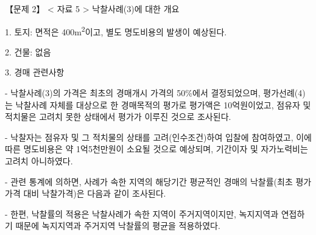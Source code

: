 \begin{longquestion}{【문제 2】}
< 자료 5 > 낙찰사례(3)에 대한 개요 \par
1. 토지: 면적은 400m\textsuperscript{2}이고, 별도 명도비용의 발생이 예상된다. \par
2. 건물: 없음 \par
3. 경매 관련사항 \par
- 낙찰사례(3)의 가격은 최초의 경매개시 가격의 50\%에서 결정되었으며, 평가선례(4)는 낙찰사례 자체를 대상으로 한 경매목적의 평가로 평가액은 10억원이었고, 점유자 및 적치물은 고려치 못한 상태에서 평가가 이루진 것으로 조사된다. \par
- 낙찰자는 점유자 및 그 적치물의 상태를 고려(인수조건)하여 입찰에 참여하였고, 이에 따른 명도비용은 약 1억5천만원이 소요될 것으로 예상되며, 기간이자 및 자가노력비는 고려치 아니하였다. \par
- 관련 통계에 의하면, 사례가 속한 지역의 해당기간 평균적인 경매의 낙찰률(최초 평가가격 대비 낙찰가격)은 다음과 같이 조사된다. \par
{\small\centering\renewcommand{\arraystretch}{1.25}
\par}

- 한편, 낙찰률의 적용은 낙찰사례가 속한 지역이 주거지역이지만, 녹지지역과 연접하기 때문에 녹지지역과 주거지역 낙찰률의 평균을 적용하였다. \par
\end{longquestion}
